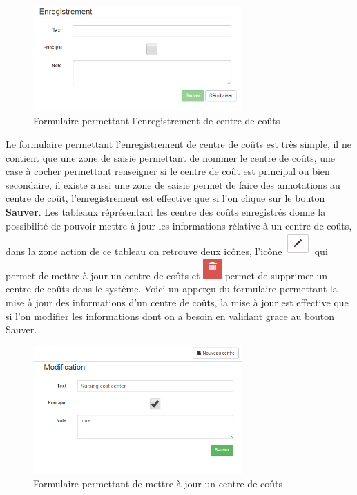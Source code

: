 \documentclass[12pt,a4paper]{report}
\begin{document}
\begin{figure}[h]
\begin{center}
\includegraphics[width=8cm]{pic/FormAddCostCenter.png}
\end{center}
\caption{Formulaire permettant l'enregistrement de centre de coûts}
\label{Formulaire permettant l'enregistrement de centre de coûts}
\end{figure} 

Le formulaire permettant l'enregistrement  de centre de coûts est très simple, il ne contient que une zone de saisie permettant de nommer le centre de coûts, une case à cocher permettant renseigner si le centre de coût est principal ou bien secondaire, il existe aussi une zone de saisie permet de faire des annotations au centre de coût, l'enregistrement est effective que si l'on clique sur le bouton \textbf{Sauver}. 
\newpage
Les tableaux réprésentant les centre des coûts enregistrés donne la possibilité de pouvoir mettre à jour les informations rélative à un centre de coûts, dans la zone action de ce tableau on retrouve deux icônes, l'icône \includegraphics[scale=0.7]{pic/EditBlack.png} qui permet de mettre à jour un centre de coûts et \includegraphics[scale=0.7]{pic/RecycleRed.png} permet de supprimer un centre de coûts dans le système.
Voici un apperçu du formulaire permettant la mise à jour des informations d'un centre de coûts, la mise à jour est effective que si l'on modifier les informations dont on a besoin en validant grace au bouton Sauver. 

\begin{figure}[h]
\begin{center}
\includegraphics[width=8cm]{pic/ModCostCenter.png}
\end{center}
\caption{Formulaire permettant de mettre à jour un centre de coûts}
\label{Formulaire permettant de mettre à jour un centre de coûts}
\end{figure} 
\newpage
\end{document}
